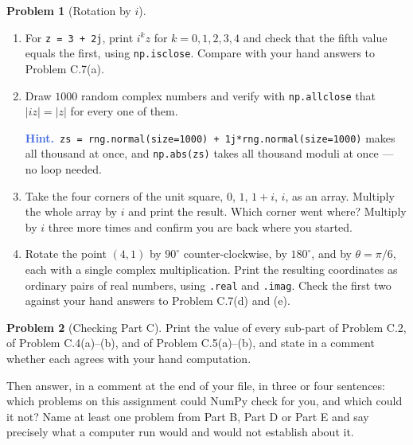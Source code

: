 \documentclass[11pt]{article}
\theoremstyle{definition}
\newtheorem{prob}{Problem}[section]
\newcommand{\hint}[1]{\par\smallskip\noindent
  {\small\sffamily\textcolor{RoyalBlue}{\textbf{Hint.}}\ #1}\par\smallskip}
\begin{document}
\begin{prob}[Rotation by $i$]
\begin{enumerate}[label=\textbf{(\alph*)},leftmargin=2.6em,itemsep=7pt,topsep=6pt]
  \item For \texttt{z = 3 + 2j}, print $i^{k}z$ for $k=0,1,2,3,4$ and check that
        the fifth value equals the first, using \texttt{np.isclose}. Compare with
        your hand answers to Problem C.7(a).
  \item Draw $1000$ random complex numbers and verify with \texttt{np.allclose}
        that $\lvert iz\rvert = \lvert z\rvert$ for every one of them.
        \hint{\texttt{zs = rng.normal(size=1000) + 1j*rng.normal(size=1000)}
        makes all thousand at once, and \texttt{np.abs(zs)} takes all thousand
        moduli at once --- no loop needed.}
  \item Take the four corners of the unit square, $0$, $1$, $1+i$, $i$, as an
        array. Multiply the whole array by $i$ and print the result. Which corner
        went where? Multiply by $i$ three more times and confirm you are back
        where you started.
  \item Rotate the point $(4,1)$ by $90^{\circ}$ counter-clockwise, by
        $180^{\circ}$, and by $\theta = \pi/6$, each with a single complex
        multiplication. Print the resulting coordinates as ordinary pairs of real
        numbers, using \texttt{.real} and \texttt{.imag}. Check the first two
        against your hand answers to Problem C.7(d) and (e).
\end{enumerate}
\end{prob}

\begin{prob}[Checking Part C]
Print the value of every sub-part of Problem C.2, of Problem C.4(a)--(b), and of
Problem C.5(a)--(b), and state in a comment whether each agrees with your hand
computation.

\medskip
\noindent Then answer, in a comment at the end of your file, in three or four
sentences: which problems on this assignment could NumPy check for you, and
which could it not? Name at least one problem from Part B, Part D or Part E and
say precisely what a computer run would and would not establish about it.
\end{prob}
\end{document}
